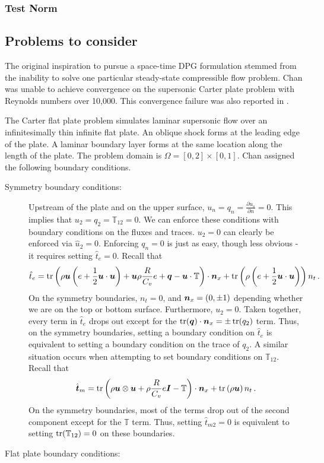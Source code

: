 \documentclass[Proposal.tex]{subfiles}
\begin{document}
\subsubsection{Test Norm}

\subsection{Problems to consider}
The original inspiration to pursue a space-time DPG formulation stemmed from the inability to solve one particular steady-state compressible flow problem.
Chan\cite{JesseDissertation} was unable to achieve convergence on the supersonic Carter plate problem\cite{Carter1973} with Reynolds numbers over 10,000.
This convergence failure was also reported in \cite{KirkDissertation}.

The Carter flat plate problem simulates laminar supersonic flow over an infinitesimally thin infinite flat plate.
An oblique shock forms at the leading edge of the plate. 
A laminar boundary layer forms at the same location along the length of the plate.
The problem domain is $\Omega=[0,2]\times[0,1]$.
Chan assigned the following boundary conditions.
\begin{description}
	\item[Symmetry boundary conditions:] Upstream of the plate and on the upper surface, $u_n=q_n=\frac{\partial u_s}{\partial n}=0$.
	This implies that $u_2=q_2=\mathbb{T}_{12}=0$. 
	We can enforce these conditions with boundary conditions on the fluxes and traces. $u_2=0$ can clearly be enforced via $\hat u_2=0$.
	Enforcing $q_n=0$ is just as easy, though less obvious - it requires setting $\hat t_e=0$.
	Recall that 
	\begin{equation*}
	\hat t_e=\operatorname*{tr}\left( \rho\boldsymbol u\left( e+\frac{1}{2}\boldsymbol u\cdot\boldsymbol u \right)+\boldsymbol u\rho\frac{R}{C_v}e+\boldsymbol q-\boldsymbol u\cdot\mathbb{T} \right)\cdot\boldsymbol n_x
	+\operatorname*{tr}\left( \rho\left( e+\frac{1}{2}\boldsymbol u\cdot\boldsymbol u \right) \right)n_t\,.
	\end{equation*}
	On the symmetry boundaries, $n_t=0$, and $\boldsymbol n_x=(0,\pm1)$ depending whether we are on the top or bottom surface. 
	Furthermore, $u_2=0$. Taken together, every term in $\hat t_e$ drops out except for the $\operatorname*{tr}(\boldsymbol q)\cdot\boldsymbol n_x=\pm\operatorname*{tr}(q_2)$ term.
	Thus, on the symmetry boundaries, setting a boundary condition on $\hat t_e$ is equivalent to setting a boundary condition on the trace of $q_2$.
	A similar situation occurs when attempting to set boundary conditions on $\mathbb{T}_{12}$. Recall that
	\begin{equation*}
	\hat{\boldsymbol t}_m=\operatorname*{tr}\left( \rho\boldsymbol u\otimes\boldsymbol u+\rho\frac{R}{C_v}e\boldsymbol I-\mathbb{T} \right)\cdot\boldsymbol n_x
	+\operatorname*{tr}\left( \rho\boldsymbol u \right) n_t\,.
	\end{equation*}
	On the symmetry boundaries, most of the terms drop out of the second component except for the $\mathbb{T}$ term.
	Thus, setting $\hat t_{m2}=0$ is equivalent to setting $\operatorname*{tr}(\mathbb{T}_{12})=0$ on these boundaries.
	\item[Flat plate boundary conditions:]

\end{description}
\end{document}
